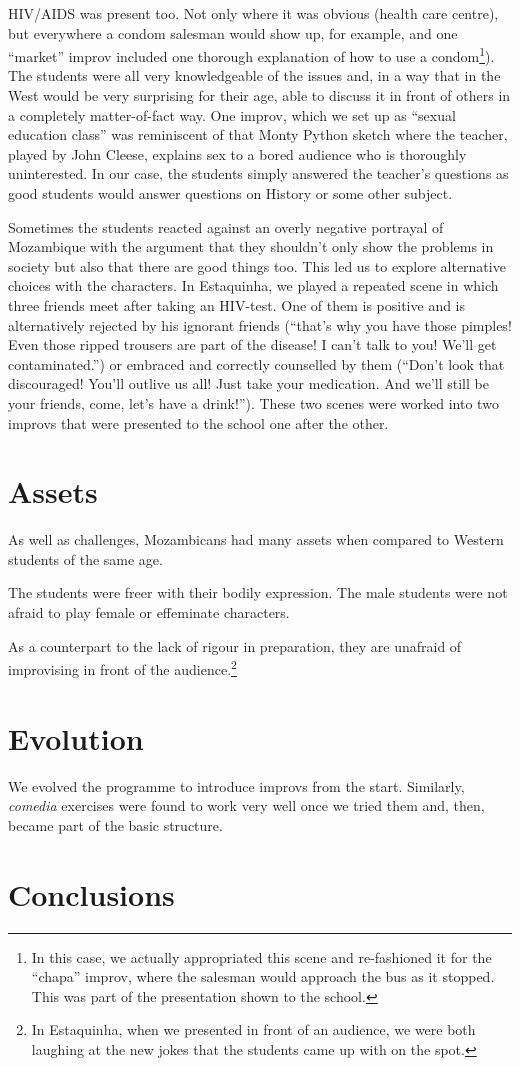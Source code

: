 \documentclass[article,twoside]{memoir}
\begin{document}
HIV/AIDS was present too. Not only where it was obvious (health care centre),
but everywhere a condom salesman would show up, for example, and one ``market''
improv included one thorough explanation of how to use a condom\footnote{In
this case, we actually appropriated this scene and re-fashioned it for the
``chapa'' improv, where the salesman would approach the bus as it stopped. This
was part of the presentation shown to the school.}). The students were all
very knowledgeable of the issues and, in a way that in the West would be very
surprising for their age, able to discuss it in front of others in a completely
matter-of-fact way. One improv, which we set up as ``sexual education class''
was reminiscent of that Monty Python sketch where the teacher, played by John
Cleese, explains sex to a bored audience who is thoroughly uninterested. In our
case, the students simply answered the teacher's questions as good students
would answer questions on History or some other subject.

Sometimes the students reacted against an overly negative portrayal of
Mozambique with the argument that they shouldn't only show the problems in
society but also that there are good things too. This led us to explore
alternative choices with the characters. In Estaquinha, we played a repeated
scene in which three friends meet after taking an HIV-test. One of them is
positive and is alternatively rejected by his ignorant friends (``that's why
you have those pimples! Even those ripped trousers are part of the disease! I
can't talk to you! We'll get contaminated.'') or embraced and correctly
counselled by them (``Don't look that discouraged! You'll outlive us all! Just
take your medication. And we'll still be your friends, come, let's have a
drink!''). These two scenes were worked into two improvs that were presented to
the school one after the other.

\chapter{Assets}
As well as challenges, Mozambicans had many assets when compared to Western
students of the same age.

The students were freer with their bodily expression. The male students were
not afraid to play female or effeminate characters.

As a counterpart to the lack of rigour in preparation, they are unafraid of
improvising in front of the audience.\footnote{In Estaquinha, when we presented
in front of an audience, we were both laughing at the new jokes that the
students came up with on the spot.}

\chapter{Evolution}

We evolved the programme to introduce improvs from the start. Similarly,
\textsl{comedia} exercises were found to work very well once we tried them and,
then, became part of the basic structure.

\chapter{Conclusions}
\end{document}
